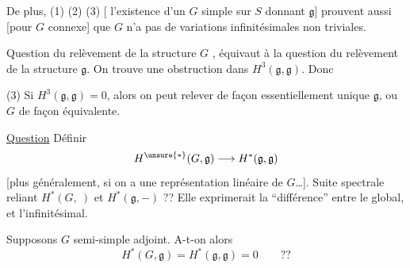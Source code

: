De plus, (1) (2) (3) [ l'existence d'un $G$ simple sur $S$ donnant $\mathfrak g$] prouvent aussi [pour $G$ connexe] que $G$ n'a pas de variations infinitésimales non triviales.

Question du relèvement de la structure $G$ , équivaut à la question du relèvement de la structure $\mathfrak g$. On trouve une obstruction dans $H^3(\mathfrak g,\mathfrak g)$. Donc


(3) Si $H^3(\mathfrak g,\mathfrak g)=0$, alors on peut relever de façon essentiellement unique $\mathfrak g$, ou $G$ de façon équivalente.

\uline{Question} Définir
\[
H^{\unsure{*}}(G,\mathfrak g)\longrightarrow H^*(\mathfrak g,\mathfrak g)
\]
[plus généralement, si on a une représentation linéaire de $G$\ldots]. Suite spectrale reliant $H^*(G,\ )$ et $H^*(\mathfrak g,-)$ ?? Elle exprimerait la ``différence'' entre le global, et l'infinitésimal.

Supposons $G$ semi-simple adjoint. A-t-on alors
\[
H^*(G,\mathfrak g)=H^*(\mathfrak g,\mathfrak g)=0\qquad??
\]
